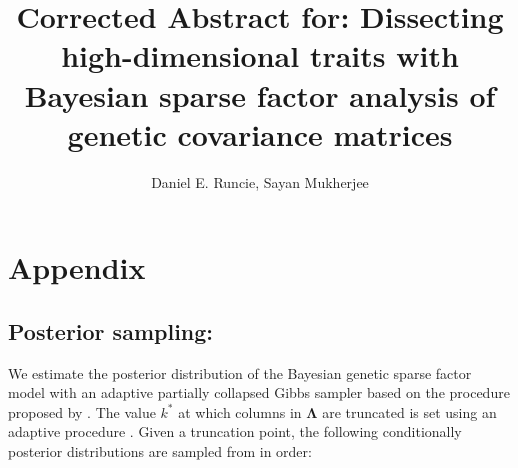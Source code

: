 \documentclass[12pt,titlepage]{article}
\title{Corrected Abstract for: Dissecting high-dimensional traits with Bayesian sparse factor analysis of genetic covariance matrices }
\author{Daniel E. Runcie, Sayan Mukherjee}
\begin{document}
\maketitle

\section{Appendix}
\subsection{Posterior sampling:}\label{postsamp}
We estimate the posterior distribution of the Bayesian genetic sparse
factor model with an adaptive partially collapsed Gibbs sampler \cite{vanDyk:2011vb} based on the procedure proposed 
by . The value $k^*$ at
which columns in $\mathbf{\Lambda}$ are truncated is set using
an adaptive procedure \cite{Bhattacharya:2011gh}.
Given a truncation point, the following conditionally posterior distributions are sampled from in order:
\end{document}
